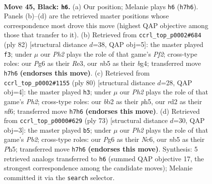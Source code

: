 \documentclass[11pt]{article}
\begin{document}
\clearpage

\begin{figure}[p]\centering
\begin{subfigure}{0.46\textwidth}\centering
\resizebox{\linewidth}{!}{%
\newchessgame
\chessboard[
  setfen={8/1p2pk1p/n5p1/pN6/2p4r/2P2P2/PB1R1K2/8 b - - 1 45},
  showmover=false,
  pgfstyle=straightmove, color=movearrow, markmove={h7-h6}
]}
\caption{}
\end{subfigure}\hfill
\begin{subfigure}{0.46\textwidth}\centering
\resizebox{\linewidth}{!}{%
\newchessgame
\chessboard[
  setfen={3r2k1/5pp1/7p/3pP2P/3P2b1/4R1P1/1B3P2/6K1 w - - 1 42},
  showmover=false,
  pgfstyle=straightmove, color=movearrow, markmove={f2-f3}
]}
\caption{}
\end{subfigure}
\\[4pt]
\begin{subfigure}{0.46\textwidth}\centering
\resizebox{\linewidth}{!}{%
\newchessgame
\chessboard[
  setfen={8/5rpk/p1N2n2/2p4p/2P5/P2R2P1/6KP/8 w - - 2 41},
  showmover=false,
  pgfstyle=straightmove, color=movearrow, markmove={h2-h3}
]}
\caption{}
\end{subfigure}\hfill
\begin{subfigure}{0.46\textwidth}\centering
\resizebox{\linewidth}{!}{%
\newchessgame
\chessboard[
  setfen={8/pp6/2nr2pk/7p/7P/1B4P1/PP2R1K1/8 b - - 4 37},
  showmover=false,
  pgfstyle=straightmove, color=movearrow, markmove={b7-b5}
]}
\caption{}
\end{subfigure}
\caption{\textbf{Move 45, Black: \texttt{h6}.} (a) Our position; Melanie plays \texttt{h6} (\texttt{h7h6}). Panels (b)--(d) are the retrieved master positions whose correspondence most drove this move (highest QAP objective among those that transfer to it). (b) Retrieved from \texttt{ccrl\_top\_p0002\#684} (ply 82) [structural distance $d$=38, QAP obj=5]: the master played \texttt{f3}; under $\mu$ our \emph{Ph2} plays the role of that game's \emph{Pf2}; cross-type roles: our \emph{P}g6 as their \emph{R}e3, our \emph{n}b5 as their \emph{b}g4; transferred move \texttt{h7h6} \textbf{(endorses this move)}. (c) Retrieved from \texttt{ccrl\_top\_p0002\#1155} (ply 80) [structural distance $d$=28, QAP obj=4]: the master played \texttt{h3}; under $\mu$ our \emph{Ph2} plays the role of that game's \emph{Ph2}; cross-type roles: our \emph{b}b2 as their \emph{p}h5, our \emph{r}d2 as their \emph{n}f6; transferred move \texttt{h7h6} \textbf{(endorses this move)}. (d) Retrieved from \texttt{ccrl\_top\_p0000\#629} (ply 73) [structural distance $d$=30, QAP obj=3]: the master played \texttt{b5}; under $\mu$ our \emph{Ph2} plays the role of that game's \emph{Pb2}; cross-type roles: our \emph{P}g6 as their \emph{N}c6, our \emph{n}b5 as their \emph{P}h5; transferred move \texttt{h7h6} \textbf{(endorses this move)}. Synthesis: 5 retrieved analogs transferred to \texttt{h6} (summed QAP objective 17, the strongest correspondence among the candidate moves); Melanie committed it via the \texttt{search} selector.}
\label{fig:thought-m89}
\end{figure}
\end{document}

